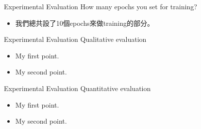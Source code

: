 \documentclass{beamer}
\begin{document}
\begin{frame}{ Experimental Evaluation }{How many epochs you set for training?}
\begin{CJK*}{UTF8}{bsmi}
  \begin{itemize}
  \item {
   我們總共設了10個epochs來做training的部分。
  }
  \end{itemize}
\end{CJK*}
\end{frame}

\begin{frame}{ Experimental Evaluation }{Qualitative evaluation }
  \begin{itemize}
  \item {
    My first point.
  }
  \item {
    My second point.
  }
  \end{itemize}
\end{frame}

\begin{frame}{ Experimental Evaluation }{Quantitative evaluation }
  \begin{itemize}
  \item {
    My first point.
  }
  \item {
    My second point.
  }
  \end{itemize}
\end{frame}
\end{document}
